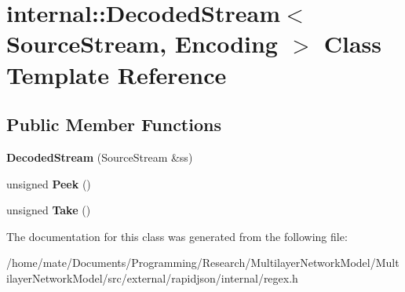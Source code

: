 \hypertarget{classinternal_1_1DecodedStream}{}\section{internal\+:\+:Decoded\+Stream$<$ Source\+Stream, Encoding $>$ Class Template Reference}
\label{classinternal_1_1DecodedStream}
\subsection*{Public Member Functions}
\begin{DoxyCompactItemize}
\item 
{\bfseries Decoded\+Stream} (Source\+Stream \&ss)\hypertarget{classinternal_1_1DecodedStream_a45cf40c4e515be8aaa8cd020eaa67595}{}\label{classinternal_1_1DecodedStream_a45cf40c4e515be8aaa8cd020eaa67595}

\item 
unsigned {\bfseries Peek} ()\hypertarget{classinternal_1_1DecodedStream_ac78f2cbc03ae0d79a0fcfe6d56589d70}{}\label{classinternal_1_1DecodedStream_ac78f2cbc03ae0d79a0fcfe6d56589d70}

\item 
unsigned {\bfseries Take} ()\hypertarget{classinternal_1_1DecodedStream_a62b45969ce169bef1da0600490329857}{}\label{classinternal_1_1DecodedStream_a62b45969ce169bef1da0600490329857}

\end{DoxyCompactItemize}


The documentation for this class was generated from the following file\+:\begin{DoxyCompactItemize}
\item 
/home/mate/\+Documents/\+Programming/\+Research/\+Multilayer\+Network\+Model/\+Multilayer\+Network\+Model/src/external/rapidjson/internal/regex.\+h\end{DoxyCompactItemize}
